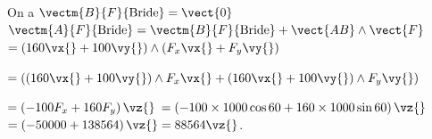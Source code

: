 \begin{corrigebox}
On a $\vectm{B}{F}{\text{Bride}} = \vect{0}$
$\vectm{A}{F}{\text{Bride}}=\vectm{B}{F}{\text{Bride}} + \vect{AB}\wedge \vect{F} $ 
$=\left(160 \vx{} + 100 \vy{}\right) \wedge \left(F_x \vx{}+F_y \vy{} \right) $

$= \left(\left(160 \vx{} + 100 \vy{}\right) \wedge  F_x \vx{}+ \left(160 \vx{} + 100 \vy{}\right) \wedge F_y \vy{} \right) $

$= \left( -100 F_x +  160  F_y   \right)\vz{} $
$= \left( -100 \times 1000 \cos 60 +  160   \times 1000 \sin 60 \right)\vz{} $
$= \left( - 50000 +  138 564 \right)\vz{} =  88 564 \vz{} $.
\end{corrigebox}
